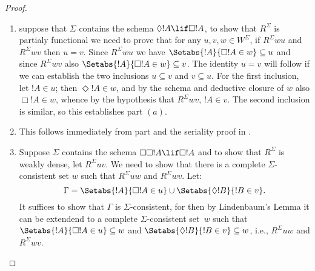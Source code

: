 \documentclass[../../../include/open-logic-section]{subfiles}
\begin{document}
\begin{proof}
  \begin{enumerate}
  \item suppose that $\Sigma$ contains the schema $\Diamond
  !A \lif \Box !A$, to show that $R^\Sigma$ is partialy
  functional we need to prove that for any $u,v,w \in W^\Sigma$, if
  $R^\Sigma wu$ and $R^\Sigma wv$ then $u=v$. Since $R^\Sigma wu$ we
  have $\Setabs{ !A}{\Box!A \in w } \subseteq u$ and since
  $R^\Sigma wv$ also $\Setabs{ !A}{\Box!A \in w } \subseteq
  v$. The identity $u=v$ will follow if we can establish the two
  inclusions $u \subseteq v$ and $v \subseteq u$. For the first
  inclusion, let $!A \in u$; then $\Diamond!A \in w$, and by
  the schema and deductive closure of $w$ also $\Box!A \in w$,
  whence by the hypothesis that $R^\Sigma wv$, $!A \in v$. The
  second inclusion is similar, so this establishes part $(a)$.

  \item This follows immediately from part 
    and the seriality proof in .

  \item Suppose $\Sigma$ contains the schema $\Box\Box!A \lif \Box!A$
    and to show that $R^\Sigma$ is weakly dense, let $R^\Sigma uv$. We
    need to show that there is a complete $\Sigma$-consistent set $w$
    such that $R^\Sigma uw$ and $R^\Sigma wv$. Let:
    \[
    \Gamma = \Setabs{!A}{\Box!A \in u } \cup \Setabs{\Diamond!B}{!B
      \in v}.
    \]
    It suffices to show that $\Gamma$ is $\Sigma$-consistent, for then
    by Lindenbaum's Lemma it can be extendend to a complete
    $\Sigma$-consistent set~$w$ such that $\Setabs{!A}{\Box!A \in u}
    \subseteq w$ and $\Setabs{\Diamond!B}{!B \in v} \subseteq w$,
    i.e., $R^\Sigma uw$ and $R^\Sigma wv$.


\end{enumerate}
\end{proof}
\end{document}

